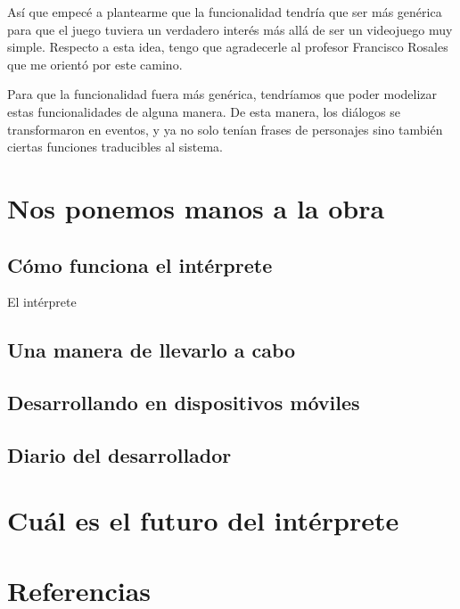 \documentclass[12pt]{article}
\begin{document}
Así que empecé a plantearme que la funcionalidad tendría que ser más genérica para que el juego tuviera un verdadero interés más allá de ser un videojuego muy simple. Respecto a esta idea, tengo que agradecerle al profesor Francisco Rosales que me orientó por este camino.

Para que la funcionalidad fuera más genérica, tendríamos que poder modelizar estas funcionalidades de alguna manera. De esta manera, los diálogos se transformaron en eventos, y ya no solo tenían frases de personajes sino también ciertas funciones traducibles al sistema.

\newpage
\section{Nos ponemos manos a la obra}

\subsection{Cómo funciona el intérprete}

El intérprete 

\subsection{Una manera de llevarlo a cabo}

\subsection{Desarrollando en dispositivos móviles}

\subsection{Diario del desarrollador}

\newpage
\section{Cuál es el futuro del intérprete}

\newpage
\section{Referencias}
\end{document}
